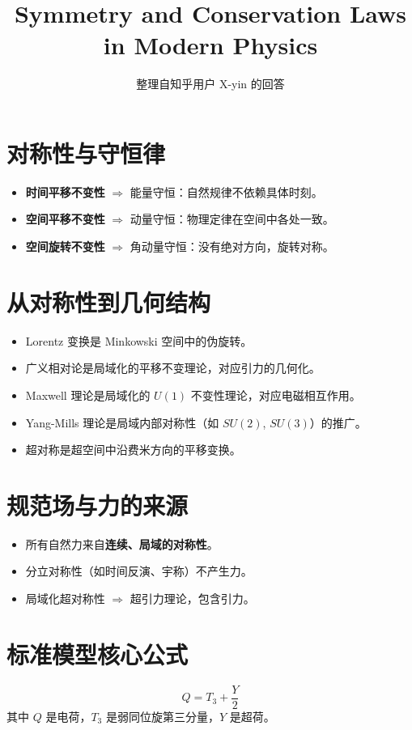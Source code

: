 \documentclass{article}
\title{Symmetry and Conservation Laws in Modern Physics}
\author{整理自知乎用户 X-yin 的回答}
\date{}
\begin{document}
\maketitle

\section{对称性与守恒律}
\begin{itemize}
  \item \textbf{时间平移不变性} $\Rightarrow$ 能量守恒：自然规律不依赖具体时刻。
  \item \textbf{空间平移不变性} $\Rightarrow$ 动量守恒：物理定律在空间中各处一致。
  \item \textbf{空间旋转不变性} $\Rightarrow$ 角动量守恒：没有绝对方向，旋转对称。
\end{itemize}

\section{从对称性到几何结构}
\begin{itemize}
  \item Lorentz 变换是 Minkowski 空间中的伪旋转。
  \item 广义相对论是局域化的平移不变理论，对应引力的几何化。
  \item Maxwell 理论是局域化的 $U(1)$ 不变性理论，对应电磁相互作用。
  \item Yang-Mills 理论是局域内部对称性（如 $SU(2)$, $SU(3)$）的推广。
  \item 超对称是超空间中沿费米方向的平移变换。
\end{itemize}

\section{规范场与力的来源}
\begin{itemize}
  \item 所有自然力来自\textbf{连续、局域的对称性}。
  \item 分立对称性（如时间反演、宇称）不产生力。
  \item 局域化超对称性 $\Rightarrow$ 超引力理论，包含引力。
\end{itemize}

\section{标准模型核心公式}
\[ Q = T_3 + \frac{Y}{2} \]
其中 $Q$ 是电荷，$T_3$ 是弱同位旋第三分量，$Y$ 是超荷。
\end{document}
